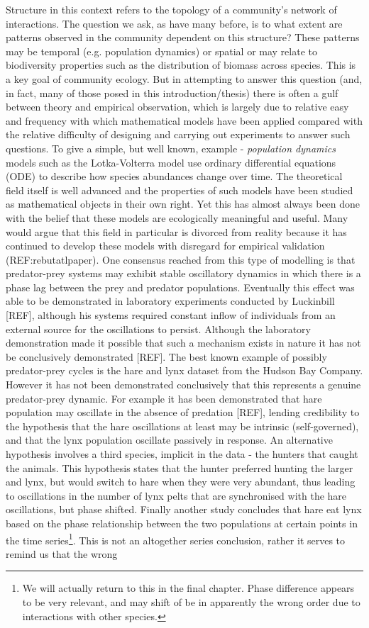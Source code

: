 Structure in this context refers to the topology of a community's network of interactions. The question we ask, as have many before, is to what extent are patterns observed in the community dependent on this structure? These patterns may be temporal (e.g. population dynamics) or spatial or may relate to biodiversity properties such as the distribution of biomass across species. This is a key goal of community ecology. But in attempting to answer this question (and, in fact, many of those posed in this introduction/thesis) there is often a gulf between theory and empirical observation, which is largely due to relative easy and frequency with which mathematical models have been applied compared with the relative difficulty of designing and carrying out experiments to answer such questions. To give a simple, but well known, example - \emph{population dynamics} models such as the Lotka-Volterra model use ordinary differential equations (ODE) to describe how species abundances change over time. The theoretical field itself is well advanced and the properties of such models have been studied as mathematical objects in their own right. Yet this has almost always been done with the belief that these models are ecologically meaningful and useful. Many would argue that this field in particular is divorced from reality because it has continued to develop these models with disregard for empirical validation (REF:rebutatlpaper). One consensus reached from this type of modelling is that predator-prey systems may exhibit stable oscillatory dynamics in which there is a phase lag between the prey and predator populations. Eventually this effect was able to be demonstrated in laboratory experiments conducted by Luckinbill [REF], although his systems required constant inflow of individuals from an external source for the oscillations to persist. Although the laboratory demonstration made it possible that such a mechanism exists in nature it has not be conclusively demonstrated [REF]. The best known example of possibly predator-prey cycles is the hare and lynx dataset from the Hudson Bay Company. However it has not been demonstrated conclusively that this represents a genuine predator-prey dynamic. For example it has been demonstrated that hare population may oscillate in the absence of predation [REF], lending credibility to the hypothesis that the hare oscillations at least may be intrinsic (self-governed)\cite{sinclair2003mammal}, and that the lynx population oscillate passively in response. An alternative hypothesis involves a third species, implicit in the data - the hunters that caught the animals. This hypothesis states that the hunter preferred hunting the larger and lynx, but would switch to hare when they were very abundant, thus leading to oscillations in the number of lynx pelts that are synchronised with the hare oscillations, but phase shifted. Finally another study concludes that hare eat lynx based on the phase relationship between the two populations at certain points in the time series\footnote{We will actually return to this in the final chapter. Phase difference appears to be very relevant, and may shift of be in apparently the wrong order due to interactions with other species.}. This is not an altogether series conclusion, rather it serves to remind us that the wrong 